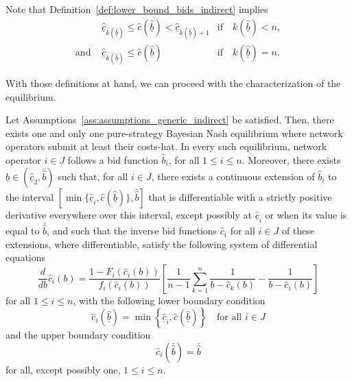 \noindent Note that Definition~\ref{def:lower_bound_bids_indirect} implies
\begin{equation}
  \label{eq:bounds_lower_bound_bids_cost_indirect}
  \begin{array}{lll}
    &\underline{\hat{c}}_{k(\underline{\hat{b}})} \leq \hat{c}(\underline{\hat{b}}) < \underline{\hat{c}}_{k(\underline{\hat{b}})+1} &\text{if}\quad k(\underline{\hat{b}}) < n,\\
    \text{and } 
    &\underline{\hat{c}}_{k(\underline{\hat{b}})} \leq \hat{c}(\underline{\hat{b}}) &\text{if}\quad k(\underline{\hat{b}}) = n.
  \end{array}
\end{equation}

With those definitions at hand, we can proceed with the characterization of the equilibrium.
\begin{proposition}
\label{prop:characterization_of_the_equilibrium_indirect}
Let Assumptions~\ref{ass:assumptions_generic_indirect} be satisfied. Then, there exists one and only one pure-strategy Bayesian Nash equilibrium where network operators submit at least their costs-hat. In every such equilibrium, network operator $i\in J$ follows a bid function $\hat{b}_i$, for all $1\leq i\leq n$. Moreover, there exists $\underline{\hat{b}}\in (\underline{\hat{c}}_2, \bar{\hat{b}})$ such that, for all $i\in J$, there exists a continuous extension of $\hat{b}_i$ to the interval $\left[\min\{\underline{\hat{c}}_i, \hat{c}(\underline{\hat{b}})\}, \bar{\hat{b}}\right]$ that is differentiable with a strictly positive derivative everywhere over this interval, except possibly at $\underline{\hat{c}}_i$ or when its value is equal to $\bar{\hat{b}}$, and such that the inverse bid functions $\hat{c}_i$ for all $i\in J$ of these extensions, where differentiable, satisfy the following system of differential equations
\begin{equation}
  \label{eq:foc_ode_indirect}
  \frac{d}{db}\hat{c}_i(b) = \frac{1 - F_i(\hat{c}_i(b))}{f_i(\hat{c}_i(b))}\left[ \frac{1}{n-1}\sum_{k=1}^n \frac{1}{b-\hat{c}_k(b)} - \frac{1}{b-\hat{c}_i(b)} \right]
\end{equation}
for all $1\leq i\leq n$, with the following lower boundary condition
\begin{equation}
  \label{eq:foc_ode_lower_boundary_indirect}
  \hat{c}_i(\underline{\hat{b}}) = \min\left\{\underline{\hat{c}}_i, \hat{c}(\underline{\hat{b}})\right\} \quad\text{for all }i\in J
\end{equation}
and the upper boundary condition
\begin{equation}
  \label{eq:foc_ode_upper_boundary_indirect}
  \hat{c}_i(\bar{\hat{b}}) = \bar{\hat{b}}
\end{equation}
for all, except possibly one, $1\leq i\leq n$.
\end{proposition}

